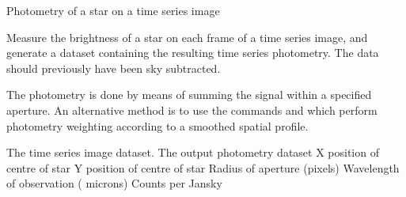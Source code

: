 \begin{manroutinedescription}
\begin{manparametertable}
\end{manparametertable}
\end{manroutinedescription}
\begin{manroutinedescription}
        Photometry of a star on a time series image

        Measure the brightness of a star on each frame of a time
        series image, and generate a {} {} dataset %
containing the
        resulting time series photometry. The data should previously
        have been sky subtracted.

        The photometry is done by means of summing the signal
        within a specified aperture. An alternative method is to
        use the commands {} and {} which %
perform
        photometry weighting according to a smoothed spatial
        profile.

\begin{manparametertable}
   The time %
series image dataset.
   The %
output photometry dataset
      X position of centre of star
      Y position of centre of star
      Radius of aperture (pixels)
      Wavelength of observation (%
microns)
      Counts per Jansky

\end{manparametertable}
\end{manroutinedescription}

